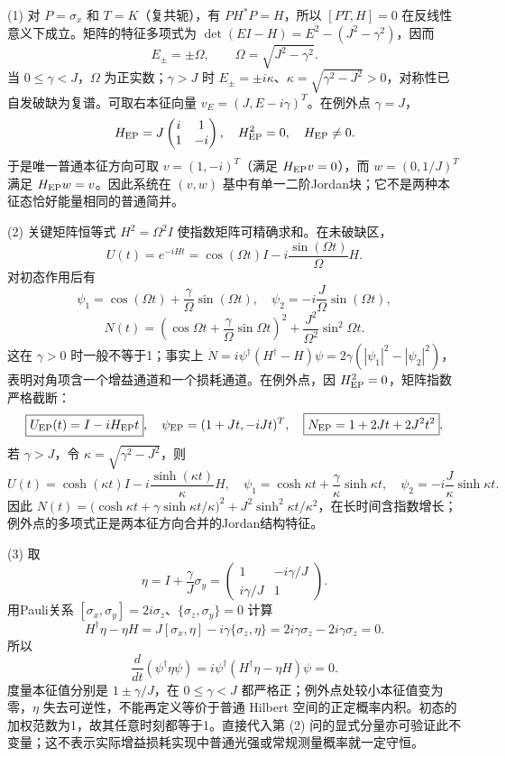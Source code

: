 (1) 对 \(P=\sigma_x\) 和 \(T=K\)（复共轭），有 \(PH^*P=H\)，所以 \([PT,H]=0\) 在反线性意义下成立。矩阵的特征多项式为
\(\det(EI-H)=E^2-(J^2-\gamma^2)\)，因而
\[
\boxed{E_\pm=\pm\Omega},\qquad \Omega=\sqrt{J^2-\gamma^2}.
\]
当 \(0\le\gamma<J\)，\(\Omega\) 为正实数；\(\gamma>J\) 时 \(E_\pm=\pm i\kappa\)、\(\kappa=\sqrt{\gamma^2-J^2}>0\)，对称性已自发破缺为复谱。可取右本征向量 \(v_E=(J,E-i\gamma)^T\)。在例外点 \(\gamma=J\)，
\[
H_{\rm EP}=J\begin{pmatrix}i&1\\1&-i\end{pmatrix},\quad
H_{\rm EP}^2=0,\quad H_{\rm EP}\ne0.
\]
于是唯一普通本征方向可取 \(v=(1,-i)^T\)（满足 \(H_{\rm EP}v=0\)），而 \(w=(0,1/J)^T\) 满足 \(H_{\rm EP}w=v\)。因此系统在 \((v,w)\) 基中有单一二阶Jordan块；它不是两种本征态恰好能量相同的普通简并。

(2) 关键矩阵恒等式 \(H^2=\Omega^2I\) 使指数矩阵可精确求和。在未破缺区，
\[
\boxed{U(t)=e^{-iHt}=\cos(\Omega t)I-i\frac{\sin(\Omega t)}{\Omega}H}.
\]
对初态作用后有
\[
\psi_1=\cos(\Omega t)+\frac{\gamma}{\Omega}\sin(\Omega t),
\quad\psi_2=-i\frac{J}{\Omega}\sin(\Omega t),
\]
\[
\boxed{N(t)=
\left(\cos\Omega t+\frac{\gamma}{\Omega}\sin\Omega t\right)^2+
\frac{J^2}{\Omega^2}\sin^2\Omega t}.
\]
这在 \(\gamma>0\) 时一般不等于1；事实上 \(\dot N=i\psi^\dagger(H^\dagger-H)\psi=2\gamma(|\psi_1|^2-|\psi_2|^2)\)，表明对角项含一个增益通道和一个损耗通道。在例外点，因 \(H_{\rm EP}^2=0\)，矩阵指数严格截断：
\[
\boxed{U_{\rm EP}(t)=I-iH_{\rm EP}t},\quad
\psi_{\rm EP}=(1+Jt,-iJt)^T,\quad
\boxed{N_{\rm EP}=1+2Jt+2J^2t^2}.
\]
若 \(\gamma>J\)，令 \(\kappa=\sqrt{\gamma^2-J^2}\)，则
\[
U(t)=\cosh(\kappa t)I-i\frac{\sinh(\kappa t)}{\kappa}H,\quad
\psi_1=\cosh\kappa t+\frac\gamma\kappa\sinh\kappa t,\quad
\psi_2=-i\frac J\kappa\sinh\kappa t.
\]
因此 \(N(t)=\bigl(\cosh\kappa t+\gamma\sinh\kappa t/\kappa\bigr)^2+
J^2\sinh^2\kappa t/\kappa^2\)，在长时间含指数增长；例外点的多项式正是两本征方向合并的Jordan结构特征。

(3) 取
\[
\boxed{\eta=I+\frac\gamma J\sigma_y
=\begin{pmatrix}1&-i\gamma/J\\i\gamma/J&1\end{pmatrix}}.
\]
用Pauli关系 \([\sigma_x,\sigma_y]=2i\sigma_z\)、\(\{\sigma_z,\sigma_y\}=0\) 计算
\[
H^\dagger\eta-\eta H
=J[\sigma_x,\eta]-i\gamma\{\sigma_z,\eta\}
=2i\gamma\sigma_z-2i\gamma\sigma_z=0.
\]
所以
\[
\frac d{dt}(\psi^\dagger\eta\psi)
=i\psi^\dagger(H^\dagger\eta-\eta H)\psi=0.
\]
度量本征值分别是 \(1\pm\gamma/J\)，在 \(0\le\gamma<J\) 都严格正；例外点处较小本征值变为零，\(\eta\) 失去可逆性，不能再定义等价于普通 Hilbert 空间的正定概率内积。初态的加权范数为1，故其任意时刻都等于1。直接代入第 (2) 问的显式分量亦可验证此不变量；这不表示实际增益损耗实现中普通光强或常规测量概率就一定守恒。

